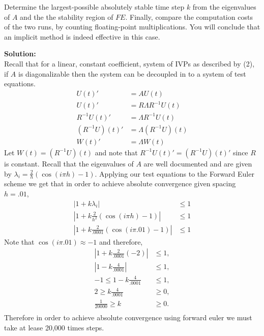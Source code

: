 \documentclass[12pt]{article}
\makeatletter
\theoremstyle{homework}
\newenvironment{exercise}[1]
{\def\@currentlabel{#1}\exercisecore}
{\endexercisecore}
\newcommand{\localhead}[1]{\par\smallskip\noindent\textbf{#1}\nobreak\\}%
\newcommand\solution{\localhead{Solution:}}
\makeatother
\begin{document}
\begin{exercise}{Problem P33}
\begin{enumerate}
    Determine the largest-possible absolutely stable time step $k$ from the eigenvalues of $A$
    and the the stability region of $FE$. Finally, compare the computation costs of the two runs, 
    by counting floating-point multiplications. You will conclude that an implicit method is indeed effective in this case. 
    \solution Recall that for a linear, constant coefficient, system of IVPs as described by (2), if $A$ is diagonalizable
    then the system can be decoupled in to a system of test equations. 
    \begin{align*}
      U(t)' &= AU(t)\\
      U(t)' &= R \Lambda R^{-1} U(t)\\
      R^{-1}U(t)' &= \Lambda R^{-1}U(t)\\
      (R^{-1}U)(t)' &= \Lambda (R^{-1}U)(t)\\
      W(t)' &= \Lambda W(t)
    \end{align*}
    Let $W(t) = (R^{-1}U)(t)$ and note that $R^{-1}U(t)' = (R^{-1}U)(t)'$ since $R$ is constant. Recall that the eigenvalues of $A$
    are well documented and are given by $\lambda_i = \frac{2}{h} (\cos(i \pi h) - 1)$.
    Applying our test equations to the Forward Euler scheme we get that in order to achieve absolute convergence given spacing $h = .01$,
    \begin{align*}
      |1 + k\lambda_i| &\leq 1\\
      |1 + k\frac{2}{h^2} (\cos(i \pi h) - 1)| &\leq 1\\
      |1 + k\frac{2}{.0001} (\cos(i \pi .01) - 1)| &\leq 1
    \end{align*}
    Note that $\cos(i \pi .01) \approx -1$ and therefore, 
    \begin{align*}
      |1 + k\frac{2}{.0001}(-2)| &\leq 1,\\
      |1 - k\frac{4}{.0001}| &\leq 1,\\
      -1\leq 1 - k\frac{4}{.0001} &\leq 1,\\
      2\geq k\frac{4}{.0001} &\geq 0,\\
      \frac{1}{20000}\geq k &\geq 0.\\
    \end{align*}
    Therefore in order to achieve absolute convergence using forward euler we must take at lease 20,000 times steps. 


\end{enumerate}
\end{exercise}
\end{document}
